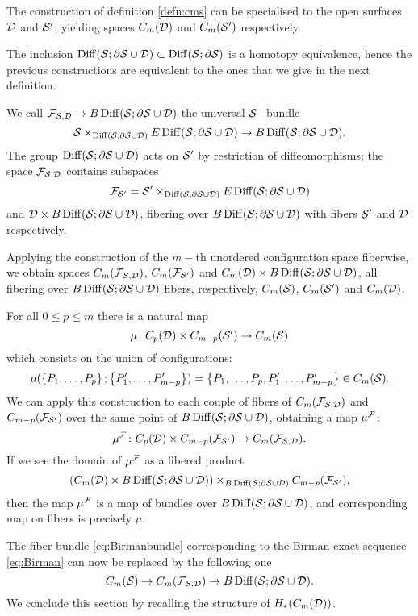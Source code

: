 The construction of definition \ref{defn:cms} can be specialised to the open
surfaces $\D$ and $\S'$, yielding spaces $C_m(\D)$ and $C_m(\S')$ respectively.

The inclusion $\Diff(\S;\partial\S\cup\D)\subset\Diff(\S;\partial\S)$ is a homotopy
equivalence, hence the previous constructions are equivalent to the ones that we
give in the next definition.
\begin{defn}
\label{defn:universalSbundle}
We call $\cF_{\S,\D}\to B\Diff(\S;\partial\S\cup\D)$
the universal $\S-$bundle
 \[
  \S\times_{\Diff(\S;\partial\S\cup\D)}E\Diff(\S;\partial\S\cup\D)\to B\Diff(\S;\partial\S\cup\D).
 \]
The group $\Diff(\S;\partial\S\cup\D)$ acts on $\S'$ by restriction of diffeomorphisms;
the space $\cF_{\S,\D}$ contains subspaces
\[
 \cF_{\S'}= \S'\times_{\Diff(\S;\partial\S\cup\D)}E\Diff(\S;\partial\S\cup\D)
\]
and $\D\times B\Diff(\S;\partial\S\cup\D)$, fibering over $B\Diff(\S;\partial\S\cup\D)$
with fibers $\S'$ and $\D$ respectively.

Applying the construction of the $m-$th unordered configuration space fiberwise, we obtain spaces
$C_m(\cF_{\S,\D})$, $C_m(\cF_{\S'})$ and $C_m(\D)\times B\Diff(\S;\partial\S\cup\D)$,
all fibering over $B\Diff(\S;\partial\S\cup\D)$ fibers, respectively, $\cms$,
$C_m(\S')$ and $C_m(\D)$.

For all $0\leq p\leq m$ there is a natural map
\[
 \mu\colon C_p(\D)\times C_{m-p}(\S')\to \cms
\]
which consists on the union of configurations:
 \[
  \mu(\set{P_1,\dots,P_p};\set{P'_1,\dots,P'_{m-p}})=\set{P_1,\dots,P_p,P'_1,\dots,P'_{m-p}}\in\cms.
 \]
We can apply this construction to each couple of fibers of $C_m(\cF_{\S,\D})$ and $C_{m-p}(\cF_{\S'})$
over the same point of $ B\Diff(\S;\partial\S\cup\D)$, obtaining a map $\mu^{\cF}$:
\[
 \mu^{\cF}\colon C_p(\D)\times C_{m-p}(\cF_{\S'})\to C_m(\cF_{\S,\D}).
\]
If we see the domain of $\mu^{\cF}$ as a fibered product
\[
 \pa{C_m(\D)\times B\Diff(\S;\partial\S\cup\D)}\times_{B\Diff(\S;\partial\S\cup\D)}C_{m-p}(\cF_{\S'}),
\]
then the map $\mu^{\cF}$ is a map of bundles over $B\Diff(\S;\partial\S\cup\D)$, and corresponding
map on fibers is precisely $\mu$.
\end{defn}
The fiber bundle \ref{eq:Birmanbundle} corresponding to the Birman exact sequence \ref{eq:Birman}
can now be replaced by the following one
\begin{equation}\label{eq:BirmanbundleD}
\cms\to C_m(\cF_{\S,\D})\to B\Diff(\S;\partial\S\cup\D).
\end{equation}
We conclude this section by recalling the structure of $H_*(C_m(\D))$.

